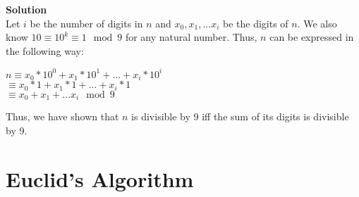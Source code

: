 \documentclass[11pt]{article}
\newcommand*{\Question}[1]{\section{#1}}
\newenvironment{Parts}{\begin{enumerate}[label=(\alph*)]}{\end{enumerate}}
\newenvironment{Answer}{\vspace{10pt}\begin{mdframed}\textbf{Solution}\\}{\end{mdframed}\vfill\pagebreak[3]}
\newenvironment{Answer}{\vspace{10pt}}{\vfill\pagebreak[3]}
\begin{document}
\begin{Parts}
	\begin{Answer}
	Let $i$ be the number of digits in $n$ and $x_0, x_1,...x_i$ be the digits of $n$. We also know $10\equiv 10^k \equiv 1 \mod 9$ for any natural number. Thus, $n$ can be expressed in the following way:
	\begin{center}
	$n \equiv x_0*10^0+x_1*10^1+...+x_i*10^i$\\
	$\equiv x_0*1+x_1*1+...+x_i*1$\\
	$\equiv x_0+x_1+...x_i \mod 9$\\
	\end{center}
	Thus, we have shown that $n$ is divisible by 9 iff the sum of its digits is divisible by 9.
	\end{Answer}
\end{Parts}


\Question{Euclid's Algorithm}
\end{document}
